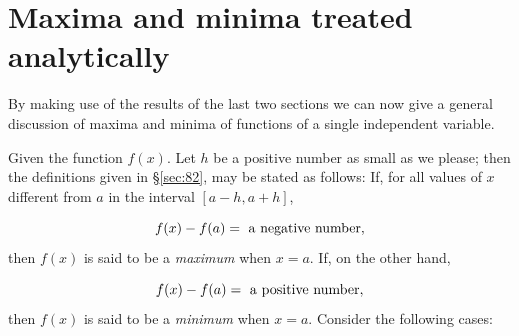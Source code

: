 \section{Maxima and minima treated analytically}
\label{sec:108}

By making use of the results of the last two sections we 
can now give a general discussion of maxima and minima of 
functions of a single independent variable.

Given the function $f(x)$. Let $h$ be a positive number as small 
as we please; then the definitions given in \S \ref{sec:82}, 
may be stated as follows:
If, for all values of $x$ different from $a$ in the interval $[a - h, a + h]$,

\begin{equation}
\label{eqn:108A}
f(x)-f(a) =\ {\rm a\ negative\ number},
\end{equation}
then $f(x)$ is said to be a {\it maximum} when $x = a$.
If, on the other hand,

\begin{equation}
\label{eqn:108B}
f(x)-f(a) =\ {\rm a\ positive\ number},
\end{equation}
then $f(x)$ is said to be a {\it minimum} when $x = a$.
Consider the following cases:

